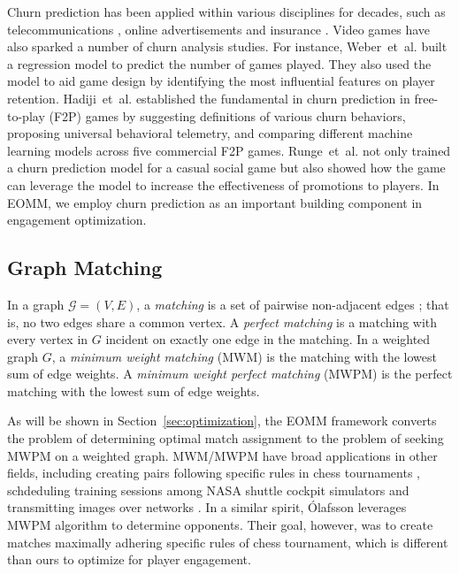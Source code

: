 Churn prediction has been applied within various disciplines for decades, such as telecommunications \cite{ferreira2004data}, online advertisements \cite{yoon2010prediction} and insurance \cite{morik2004analysing}. Video games have also sparked a number of churn analysis studies. For instance, Weber~et~al.\! \cite{weber2011modeling} built a regression model to predict the number of games played. They also used the model to aid game design by identifying the most influential features on player retention. Hadiji~et~al.\! \cite{hadiji2014predicting} established the fundamental in churn prediction in free-to-play (F2P) games by suggesting definitions of various churn behaviors, proposing universal behavioral telemetry, and comparing different machine learning models across five commercial F2P games. Runge~et~al.\! \cite{runge2014churn} not only trained a churn prediction model for a casual social game but also showed how the game can leverage the model to increase the effectiveness of promotions to players. In EOMM, we employ churn prediction as an important building component in engagement optimization.


\subsection{Graph Matching}
In a graph $\mathcal{G}=(V, E)$, a \textit{matching} is a set of pairwise non-adjacent edges \cite{west2001introduction}; that is, no two edges share a common vertex. A \textit{perfect matching} is a matching with every vertex in $G$ incident on exactly one edge in the matching.  In a weighted graph $G$, a \textit{minimum weight matching } (MWM) is the matching with the lowest sum of edge weights. A \textit{minimum weight perfect matching} (MWPM) is the perfect matching with the lowest sum of edge weights.

As will be shown in Section~\ref{sec:optimization}, the EOMM framework converts the problem of determining optimal match assignment to the problem of seeking MWPM on a weighted graph. MWM/MWPM have broad applications in other fields, including creating pairs following specific rules in chess tournaments \cite{olafsson1990weighted}, schdeduling training sessions among NASA shuttle cockpit simulators \cite{bell1994weighted} and transmitting images over networks \cite{riskin1994index}. In a similar spirit, \'{O}lafsson \cite{olafsson1990weighted} leverages MWPM algorithm to determine opponents. Their goal, however, was to create matches maximally adhering specific rules of chess tournament, which is different than ours to optimize for player engagement.

